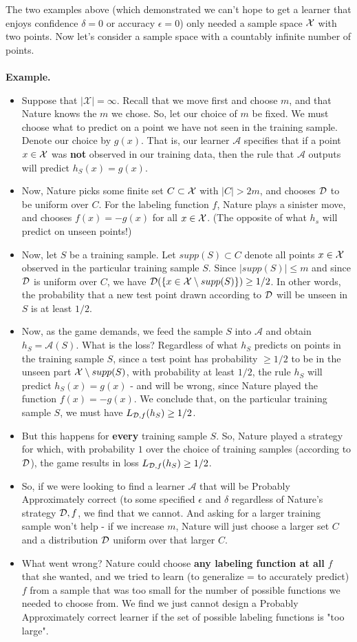 \documentclass[11pt]{article}
\newcommand{\Ac}{\mathcal{A}}
\begin{document}
The two examples above (which demonstrated we can't hope to get a learner that enjoys confidence $\delta=0$ or accuracy $\epsilon=0$) only needed a sample space $\mathcal{X}$ with two points. 
Now let's consider a sample space with a countably infinite number of points.  
\\~\\
{\bf Example.}
\begin{itemize}
\item Suppose that $|\mathcal{X}| = \infty$. Recall that we move first and choose $m$, and that Nature knows the $m$ we chose. So, let our choice of $m$ be fixed. We must choose what to predict on a point we have not seen in the training sample. Denote our choice by 
$g(x)$. That is, our learner $\Ac$ specifies that if a point $x\in\mathcal{X}$ was {\bf not} observed in our training data, then the rule that $\Ac$ outputs will predict $h_S(x)=g(x)$. 
\item Now, Nature picks some finite set $C \subset \mathcal{X}$ with $ |C| > 2m$, and chooses $\mathcal{D}$ to be uniform 
over $C$. For the labeling function $f$, Nature plays a sinister move, and chooses $f(x)=-g(x)$ for all $x\in\mathcal{X}$. (The opposite of what $h_s$ will predict on unseen points!)
\item Now, let $S$ be a training sample. Let $supp(S)\subset C$ denote all points $x\in\mathcal{X}$ observed in the particular training sample $S$.
Since $|supp(S)|\leq m$ and since $\mathcal{D}$ is uniform over $C$, we have $\mathcal{D}(\{x\in \mathcal{X}\setminus supp(S)\})\geq 1/2$.
In other words, the probability that a new test point drawn according to $\mathcal{D}$ will be unseen in $S$ is at least $1/2$.
\item Now, as the game demands, we feed the sample $S$ into $\Ac$ and obtain $h_S=\Ac(S)$. What is the loss? Regardless of what $h_S$ predicts on points in the training sample $S$, since a test point has probability $\geq 1/2$ to be in the unseen part $\mathcal{X}\setminus supp(S)$, with probability at least $1/2$, the rule $h_S$ will predict $h_S(x)=g(x)$ - and will be wrong, since Nature played the function $f(x)=-g(x)$. We conclude that, on the particular training sample $S$, we must have $L_{\mathcal{D},f}(h_S)\geq 1/2$.
\item But this happens for {\bf every} training sample $S$. So, Nature played a strategy for which, with probability $1$ over the choice of training samples (according to $\mathcal{D}$), the game results in loss  $L_{\mathcal{D},f}(h_S)\geq 1/2$.
\item So, if we were looking to find a learner $\Ac$ that will be Probably
  Approximately correct (to some specified $\epsilon$ and $\delta$ regardless of Nature's strategy $\mathcal{D},f$, we find that we cannot. And asking for a larger training sample won't help - if we increase $m$, Nature will just choose a larger set $C$ and a distribution $\mathcal{D}$ uniform over that larger $C$.
\item What went wrong? Nature could choose {\bf any labeling function at all} $f$ that she wanted, and we tried to learn (to generalize = to accurately predict) $f$ from a sample that was too small for the number of possible functions we needed to choose from. We find we just cannot design a Probably Approximately correct learner if the set of possible labeling functions is "too large". 
\end{itemize} 
\end{document}
